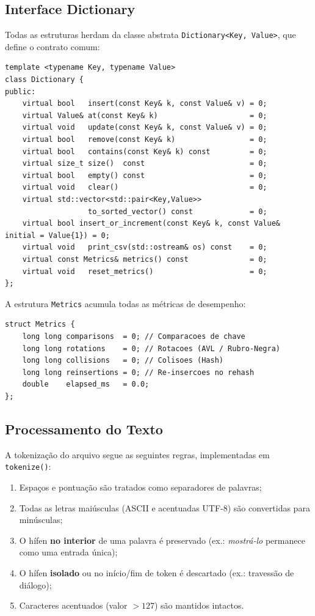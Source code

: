 \documentclass[12pt, a4paper]{article}
\begin{document}
\subsection{Interface Dictionary}

Todas as estruturas herdam da classe abstrata \texttt{Dictionary<Key, Value>}, que
define o contrato comum:

\begin{lstlisting}[caption={Interface Dictionary (simplificada).}]
template <typename Key, typename Value>
class Dictionary {
public:
    virtual bool   insert(const Key& k, const Value& v) = 0;
    virtual Value& at(const Key& k)                     = 0;
    virtual void   update(const Key& k, const Value& v) = 0;
    virtual bool   remove(const Key& k)                 = 0;
    virtual bool   contains(const Key& k) const         = 0;
    virtual size_t size()  const                        = 0;
    virtual bool   empty() const                        = 0;
    virtual void   clear()                              = 0;
    virtual std::vector<std::pair<Key,Value>>
                   to_sorted_vector() const             = 0;
    virtual bool insert_or_increment(const Key& k, const Value& initial = Value{1}) = 0;
    virtual void   print_csv(std::ostream& os) const    = 0;
    virtual const Metrics& metrics() const              = 0;
    virtual void   reset_metrics()                      = 0;
};
\end{lstlisting}

A estrutura \texttt{Metrics} acumula todas as métricas de desempenho:

\begin{lstlisting}[caption={Estrutura Metrics.}]
struct Metrics {
    long long comparisons  = 0; // Comparacoes de chave
    long long rotations    = 0; // Rotacoes (AVL / Rubro-Negra)
    long long collisions   = 0; // Colisoes (Hash)
    long long reinsertions = 0; // Re-insercoes no rehash
    double    elapsed_ms   = 0.0;
};
\end{lstlisting}

\subsection{Processamento do Texto}

A tokenização do arquivo segue as seguintes regras, implementadas em \texttt{tokenize()}:

\begin{enumerate}
    \item Espaços e pontuação são tratados como separadores de palavras;
    \item Todas as letras maiúsculas (ASCII e acentuadas UTF-8) são convertidas
          para minúsculas;
    \item O hífen \textbf{no interior} de uma palavra é preservado
          (ex.: \textit{mostrá-lo} permanece como uma entrada única);
    \item O hífen \textbf{isolado} ou no início/fim de token é descartado
          (ex.: travessão de diálogo);
    \item Caracteres acentuados (valor $> 127$) são mantidos intactos.
\end{enumerate}
\end{document}

